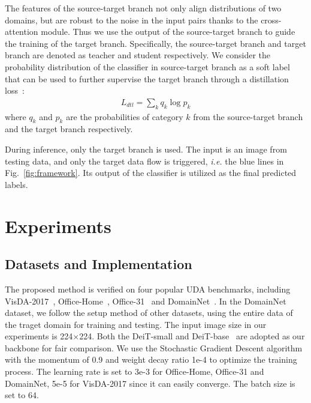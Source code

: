 \documentclass[dvipsnames, svgnames, x11names, table]{article} \usepackage{iclr2022_conference,times}
\begin{document}
\begin{spacing}{1.0}
The features of the source-target branch not only align distributions of two domains, but are robust to the noise in the input pairs thanks to the cross-attention module.
Thus we use the output of the source-target branch to guide the training of the target branch. Specifically, the source-target branch and target branch are denoted as teacher and student respectively. We consider the probability distribution of the classifier in source-target branch as a soft label that can be used to further supervise the target branch through a distillation loss~\citep{hinton2015distilling}:
\begin{gather}
L_{dtl}=\sum_kq_k\log p_k
\label{eq:distillloss}
\end{gather}
where $q_k$ and $p_k$ are the probabilities of category $k$ from the source-target branch and the target branch respectively.

During inference, only the target branch is used. The input is an image from testing data, and only the target data flow is triggered, \textit{i.e.} the blue lines in Fig.~\ref{fig:framework}. Its output of the classifier is utilized as the final predicted labels.





\section{Experiments}

\subsection{Datasets and Implementation}
The proposed method is verified on four popular UDA benchmarks, including VisDA-2017~\citep{visda2017}, Office-Home~\citep{venkateswara2017deep},
Office-31~\citep{saenko2010adapting}
and DomainNet~\citep{peng2019moment}.
In the DomainNet dataset, we follow the setup method of other datasets, using the entire data of the traget domain for training and testing.
The input image size in our experiments is 224$\times$224. Both the DeiT-small and DeiT-base~\citep{touvron2021training} are adopted as our backbone for fair comparison.
We use the Stochastic Gradient Descent algorithm with the momentum of 0.9 and weight decay ratio 1e-4 to optimize the training process.
The learning rate is set to 3e-3 for Office-Home, Office-31 and DomainNet, 5e-5 for VisDA-2017 since it can easily converge. The batch size is set to 64. 





\end{spacing}
\end{document}
